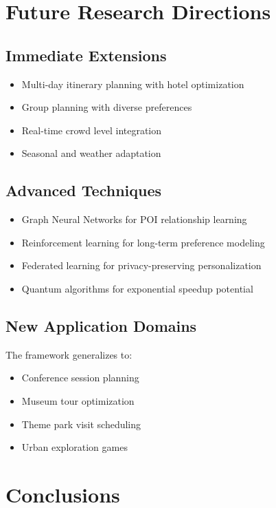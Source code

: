 \section{Future Research Directions}

\subsection{Immediate Extensions}
\begin{itemize}
    \item Multi-day itinerary planning with hotel optimization
    \item Group planning with diverse preferences
    \item Real-time crowd level integration
    \item Seasonal and weather adaptation
\end{itemize}

\subsection{Advanced Techniques}
\begin{itemize}
    \item Graph Neural Networks for POI relationship learning
    \item Reinforcement learning for long-term preference modeling
    \item Federated learning for privacy-preserving personalization
    \item Quantum algorithms for exponential speedup potential
\end{itemize}

\subsection{New Application Domains}
The framework generalizes to:
\begin{itemize}
    \item Conference session planning
    \item Museum tour optimization
    \item Theme park visit scheduling
    \item Urban exploration games
\end{itemize}

\section{Conclusions}

